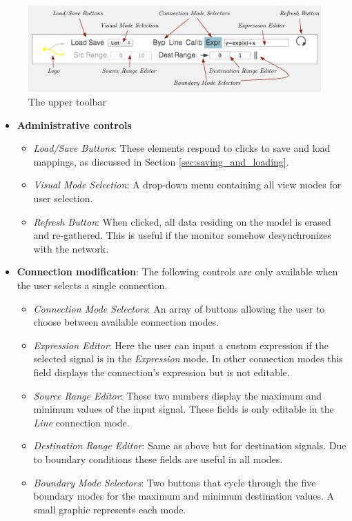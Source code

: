 \begin{figure}[!ht]
\centering
	\includegraphics[width=1\textwidth]{figures/top_toolbar}
\caption{The upper toolbar}
\label{fig:toolbar}
\end{figure}

\begin{itemize}
	\item \textbf{Administrative controls}
	\begin{itemize}
		\item\emph{Load/Save Buttons}: These elements respond to clicks to save and load mappings, as discussed in Section \ref{sec:saving_and_loading}.
		\item\emph{Visual Mode Selection}: A drop-down menu containing all view modes for user selection.
		\item\emph{Refresh Button}: When clicked, all data residing on the model is erased and re-gathered. This is useful if the monitor somehow desynchronizes with the network.
	\end{itemize}

	\item \textbf{Connection modification}: The following controls are only available when the user selects a single connection.
	\begin{itemize}
		\item\emph{Connection Mode Selectors}: An array of buttons allowing the user to choose between available connection modes.
		\item\emph{Expression Editor}: Here the user can input a custom expression if the selected signal is in the \emph{Expression} mode. In other connection modes this field displays the connection's expression but is not editable.
		\item\emph{Source Range Editor}: These two numbers display the maximum and minimum values of the input signal. These fields is only editable in the \emph{Line} connection mode.
		\item\emph{Destination Range Editor}: Same as above but for destination signals. Due to boundary conditions these fields are useful in all modes.
		\item\emph{Boundary Mode Selectors}: Two buttons that cycle through the five boundary modes for the maximum and minimum destination values. A small graphic represents each mode.
	\end{itemize}
\end{itemize}

